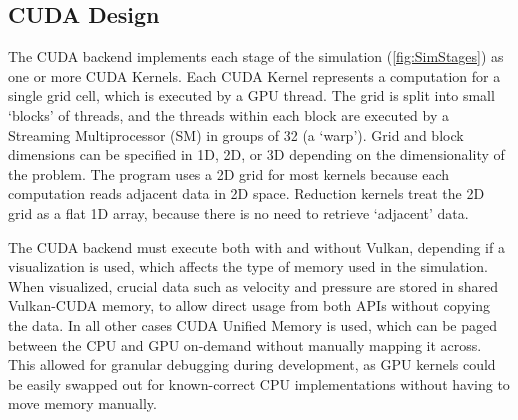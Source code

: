 
\subsection{CUDA Design}\label{sec:Design:Simulation}

The CUDA backend implements each stage of the simulation (\cref{fig:SimStages}) as one or more CUDA Kernels.
Each CUDA Kernel represents a computation for a single grid cell, which is executed by a GPU thread.
The grid is split into small `blocks' of threads, and the threads within each block are executed by a Streaming Multiprocessor (SM) in groups of 32 (a `warp').
Grid and block dimensions can be specified in 1D, 2D, or 3D depending on the dimensionality of the problem.
The program uses a 2D grid for most kernels because each computation reads adjacent data in 2D space.
Reduction kernels treat the 2D grid as a flat 1D array, because there is no need to retrieve `adjacent' data.

The CUDA backend must execute both with and without Vulkan, depending if a visualization is used, which affects the type of memory used in the simulation.
When visualized, crucial data such as velocity and pressure are stored in shared Vulkan-CUDA memory, to allow direct usage from both APIs without copying the data.
In all other cases CUDA Unified Memory is used, which can be paged between the CPU and GPU on-demand without manually mapping it across\cite{Harris2017UnifiedBlog}.
This allowed for granular debugging during development, as GPU kernels could be easily swapped out for known-correct CPU implementations without having to move memory manually.

